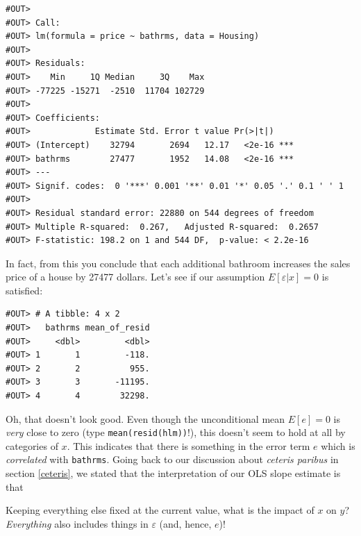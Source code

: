 \documentclass[]{book}
\newenvironment{Shaded}{\begin{snugshade}}{\end{snugshade}}
\newcommand{\CommentTok}[1]{\textcolor[rgb]{0.56,0.35,0.01}{\textit{#1}}}
\newcommand{\DataTypeTok}[1]{\textcolor[rgb]{0.13,0.29,0.53}{#1}}
\newcommand{\KeywordTok}[1]{\textcolor[rgb]{0.13,0.29,0.53}{\textbf{#1}}}
\newcommand{\NormalTok}[1]{#1}
\newcommand{\OperatorTok}[1]{\textcolor[rgb]{0.81,0.36,0.00}{\textbf{#1}}}
\newcommand{\StringTok}[1]{\textcolor[rgb]{0.31,0.60,0.02}{#1}}
\newenvironment{tip}{\begin{tcolorbox}[colback=green!5!white,colframe=green]}{\end{tcolorbox}}
\begin{document}
\begin{verbatim}
#OUT> 
#OUT> Call:
#OUT> lm(formula = price ~ bathrms, data = Housing)
#OUT> 
#OUT> Residuals:
#OUT>    Min     1Q Median     3Q    Max 
#OUT> -77225 -15271  -2510  11704 102729 
#OUT> 
#OUT> Coefficients:
#OUT>             Estimate Std. Error t value Pr(>|t|)    
#OUT> (Intercept)    32794       2694   12.17   <2e-16 ***
#OUT> bathrms        27477       1952   14.08   <2e-16 ***
#OUT> ---
#OUT> Signif. codes:  0 '***' 0.001 '**' 0.01 '*' 0.05 '.' 0.1 ' ' 1
#OUT> 
#OUT> Residual standard error: 22880 on 544 degrees of freedom
#OUT> Multiple R-squared:  0.267,   Adjusted R-squared:  0.2657 
#OUT> F-statistic: 198.2 on 1 and 544 DF,  p-value: < 2.2e-16
\end{verbatim}

In fact, from this you conclude that each additional bathroom increases the sales price of a house by 27477 dollars. Let's see if our assumption \(E[\varepsilon|x] = 0\) is satisfied:

\begin{Shaded}
\end{Shaded}

\begin{verbatim}
#OUT> # A tibble: 4 x 2
#OUT>   bathrms mean_of_resid
#OUT>     <dbl>         <dbl>
#OUT> 1       1         -118.
#OUT> 2       2          955.
#OUT> 3       3       -11195.
#OUT> 4       4        32298.
\end{verbatim}

Oh, that doesn't look good. Even though the unconditional mean \(E[e] = 0\) is \emph{very} close to zero (type \texttt{mean(resid(hlm))}!), this doesn't seem to hold at all by categories of \(x\). This indicates that there is something in the error term \(e\) which is \emph{correlated} with \texttt{bathrms}. Going back to our discussion about \emph{ceteris paribus} in section \ref{ceteris}, we stated that the interpretation of our OLS slope estimate is that

\begin{tip}
Keeping everything else fixed at the current value, what is the impact
of \(x\) on \(y\)? \emph{Everything} also includes things in
\(\varepsilon\) (and, hence, \(e\))!
\end{tip}
\end{document}
